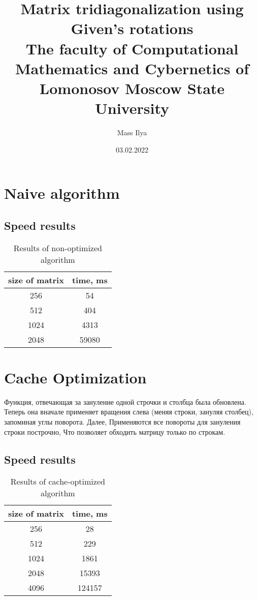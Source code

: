 \documentclass[12pt]{report}
\begin{document}
	\title{
		{Matrix tridiagonalization using Given's rotations}\\
		{\large The faculty of Computational Mathematics and Cybernetics of Lomonosov Moscow State University}\\
	}
	\author{Mass Ilya}
	\date{03.02.2022}
	
	\maketitle
	
	\chapter{Naive algorithm}
	
	
	\section{Speed results}
	\begin{table}[h!]
		\centering
		\begin{tabular}{ | c | c | } 
			\hline
			size of matrix & time, ms\\  [0.5ex] 
			\hline\hline
			256 & 54 \\ 
			\hline
			512 & 404 \\ 
			\hline
			1024 & 4313 \\
			\hline
			2048 & 59080 \\
			\hline
		\end{tabular}
		\caption{Results of non-optimized algorithm}
	\end{table}  

	\chapter{Cache Optimization}
	Функция, отвечающая за зануление одной строчки и столбца была обновлена. Теперь она вначале применяет вращения слева
	(меняя строки, зануляя столбец), запоминая углы поворота. Далее, Применяются все повороты для зануления строки построчно,
	Что позволяет обходить матрицу только по строкам.

	\section{Speed results}
	\begin{table}[h!]
		\centering
		\begin{tabular}{ | c | c | }
			\hline
			size of matrix & time, ms\\  [0.5ex]
			\hline\hline
			256 & 28 \\
			\hline
			512 & 229 \\
			\hline
			1024 & 1861 \\
			\hline
			2048 & 15393 \\
			\hline
			4096 & 124157 \\
			\hline
		\end{tabular}
		\caption{Results of cache-optimized algorithm}
	\end{table}
\end{document}
